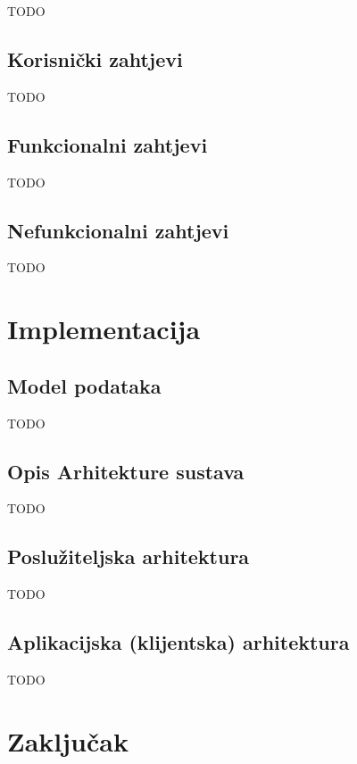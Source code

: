 \documentclass[times, utf8, diplomski, numeric]{fer}
\begin{document}
TODO


\section{Korisnički zahtjevi}

TODO


\section{Funkcionalni zahtjevi}

TODO


\section{Nefunkcionalni zahtjevi}

TODO



\chapter{Implementacija}


\section{Model podataka}

TODO


\section{Opis Arhitekture sustava}

TODO


\section{Poslužiteljska arhitektura}

TODO


\section{Aplikacijska (klijentska) arhitektura}

TODO



\chapter{Zaključak}
\end{document}
